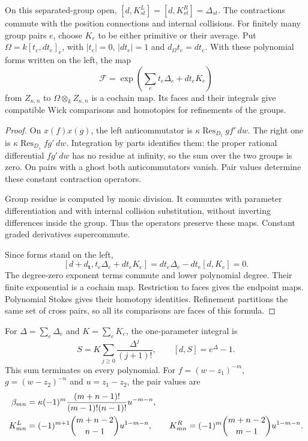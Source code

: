 \begin{theorem}
\label{cbc:ct:wick-homotopy}
On this separated-group open,
$[d,K^L_{st}]=[d,K^R_{st}]=\Delta_{st}$.
The contractions commute with the position connections and
internal collisions. For finitely many group pairs $e$, choose
$K_e$ to be either primitive or their average. Put
$\Omega=k[t_e,dt_e]_e$, with $|t_e|=0$, $|dt_e|=1$ and
$d_\Omega t_e=dt_e$. With these polynomial forms written
on the left, the map
\begin{equation}\label{cbc:ct:wick-cube}
 \mathcal F=\exp\left(\sum_e t_e\Delta_e+dt_eK_e\right)
\end{equation}
from $Z_{\kappa,n}$ to $\Omega\otimes_kZ_{\kappa,n}$ is a
cochain map. Its faces and their integrals give compatible
Wick comparisons and homotopies for refinements of the groups.
\end{theorem}

\begin{proof}
On $x(f)x(g)$, the left anticommutator is
$\kappa\operatorname{Res}_{D_t}gf'\,dw$. The right one is
$\kappa\operatorname{Res}_{D_s}fg'\,dw$. Integration by
parts identifies them: the proper rational differential $fg'\,dw$
has no residue at infinity, so the sum over the two groups is
zero. On pairs with a ghost both anticommutators vanish.
Pair values determine these constant contraction operators.

Group residue is computed by monic division. It commutes with
parameter differentiation and with internal collision substitution,
without inverting differences inside the group. Thus the operators
preserve these maps. Constant graded derivatives supercommute.

Since forms stand on the left,
\[
 [d+d_{\mathbf t},t_e\Delta_e+dt_eK_e]
     =dt_e\Delta_e-dt_e[d,K_e]=0.
\]
The degree-zero exponent terms commute and lower polynomial
degree. Their finite exponential is a cochain map. Restriction
to faces gives the endpoint maps. Polynomial Stokes gives their
homotopy identities. Refinement partitions the same set of cross
pairs, so all its comparisons are faces of this formula.
\end{proof}

For $\Delta=\sum_e\Delta_e$ and $K=\sum_eK_e$, the
one-parameter integral is
\[
 S=K\sum_{j\geq0}\frac{\Delta^j}{(j+1)!},\qquad
       [d,S]=e^\Delta-1.
\]
This sum terminates on every polynomial. For
$f=(w-z_1)^{-m}$, $g=(w-z_2)^{-n}$ and $u=z_1-z_2$,
the pair values are
\begin{align}
 \beta_{mn}&=\kappa(-1)^m
       \frac{(m+n-1)!}{(m-1)!(n-1)!}u^{-m-n},
                                     \label{cbc:ct:wick-values}\\
 K^L_{mn}&=(-1)^{m+1}\binom{m+n-2}{n-1}u^{1-m-n},\qquad
 K^R_{mn}=(-1)^m\binom{m+n-2}{m-1}u^{1-m-n}.
                                     \notag
\end{align}

